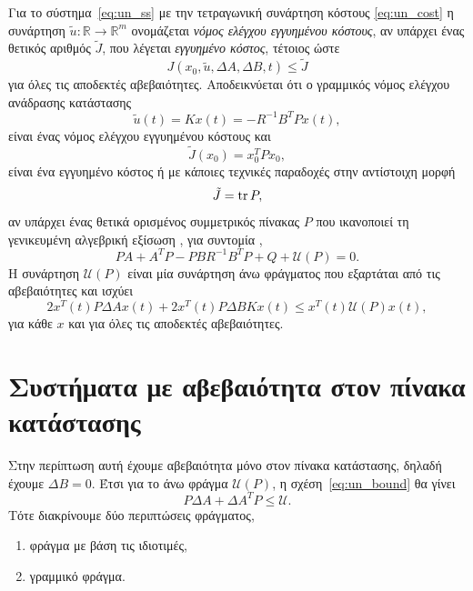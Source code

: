 Για το σύστημα~\eqref{eq:un_ss} με την τετραγωνική συνάρτηση κόστους
\eqref{eq:un_cost} η συνάρτηση \( \tilde{u}:\mathbb{R} \to \mathbb{R}^m \)
ονομάζεται \emph{νόμος ελέγχου εγγυημένου κόστους}, αν υπάρχει ένας θετικός
αριθμός \( \tilde{J} \), που λέγεται \emph{εγγυημένο κόστος}, τέτοιος ώστε
\[
    J(x_0, \tilde{u}, \Delta A, \Delta B, t) \leq \tilde{J}
\]
για όλες τις αποδεκτές αβεβαιότητες. Αποδεικνύεται ότι ο γραμμικός νόμος ελέγχου
ανάδρασης κατάστασης
\begin{equation}\label{eq:un_u_tilde}
    \tilde{u}(t) = Kx(t) = - R^{-1}B^{T}Px(t),
\end{equation}
είναι ένας νόμος ελέγχου εγγυημένου κόστους και
\[
    \tilde{J}(x_0) = x_0^{T}Px_0,
\]
είναι ένα εγγυημένο κόστος ή με κάποιες τεχνικές παραδοχές στην αντίστοιχη μορφή
\begin{equation}\label{eq:un_gcc_J}
    \tilde{J} = \operatorname{tr}{P},
\end{equation}
αν υπάρχει ένας θετικά ορισμένος συμμετρικός πίνακας
\( P \) που ικανοποιεί τη γενικευμένη αλγεβρική εξίσωση , για
συντομία ,
\begin{equation}\label{eq:un_gare_general}
    PA + A^{T}P - PBR^{-1}B^{T}P + Q + \mathcal{U}(P) = 0.
\end{equation}
Η συνάρτηση \( \mathcal{U}(P) \) είναι μία συνάρτηση άνω φράγματος που εξαρτάται
από τις αβεβαιότητες και ισχύει
\begin{equation}\label{eq:un_bound}
    2x^T(t)P\Delta Ax(t) + 2 x^T(t)P\Delta BKx(t) \leq x^T(t)\mathcal{U}(P)x(t),
\end{equation}
για κάθε \( x \) και για όλες τις αποδεκτές αβεβαιότητες.

\section{Συστήματα με αβεβαιότητα στον πίνακα κατάστασης}
Στην περίπτωση αυτή έχουμε αβεβαιότητα μόνο στον πίνακα κατάστασης, δηλαδή
έχουμε \( \Delta B = 0 \). Έτσι για το άνω φράγμα \( \mathcal{U}(P) \), η
σχέση~\eqref{eq:un_bound} θα γίνει
\begin{equation}\label{eq:un_bound_linear}
    P\Delta A + \Delta A^{T}P \leq \mathcal{U}.
\end{equation}
Τότε διακρίνουμε δύο περιπτώσεις φράγματος,
\begin{enumerate} [label = (\enumgreek*)]
    \item φράγμα με βάση τις ιδιοτιμές,
    \item γραμμικό φράγμα.
\end{enumerate}

